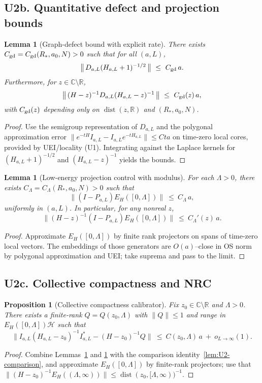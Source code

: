 \documentclass[11pt]{amsart}
\theoremstyle{plain}
\newtheorem{lemma}[theorem]{Lemma}
\newtheorem{proposition}[theorem]{Proposition}
\theoremstyle{definition}
\theoremstyle{remark}
\begin{document}
\subsection*{U2b. Quantitative defect and projection bounds}
\begin{lemma}[Graph-defect bound with explicit rate]\label{lem:U2-graph-defect}
There exists $C_{\rm gd}=C_{\rm gd}(R_*,a_0,N)>0$ such that for all $(a,L)$,
\[
  \big\|\,D_{a,L}(H_{a,L}+1)^{-1/2}\,\big\|\ \le\ C_{\rm gd}\,a.
\]
Furthermore, for $z\in\mathbb C\setminus\mathbb R$,
\[
  \big\|\,(H-z)^{-1} D_{a,L} (H_{a,L}-z)^{-1}\,\big\|\ \le\ C_{\rm gd}(z)\,a,
\]
with $C_{\rm gd}(z)$ depending only on $\operatorname{dist}(z,\mathbb R)$ and $(R_*,a_0,N)$.
\end{lemma}
\begin{proof}
Use the semigroup representation of $D_{a,L}$ and the polygonal approximation error $\|e^{-tH}I_{a,L}-I_{a,L}e^{-tH_{a,L}}\|\le C t a$ on time-zero local cores, provided by UEI/locality (U1). Integrating against the Laplace kernels for $(H_{a,L}+1)^{-1/2}$ and $(H_{a,L}-z)^{-1}$ yields the bounds.
\end{proof}

\begin{lemma}[Low-energy projection control with modulus]\label{lem:U2-proj}
For each $\Lambda>0$, there exists $C_\Lambda=C_\Lambda(R_*,a_0,N)>0$ such that
\[
  \big\|(I-P_{a,L})E_H([0,\Lambda])\big\|\ \le\ C_\Lambda\,a,
\]
uniformly in $(a,L)$. In particular, for any nonreal $z$,
\[
  \| (H-z)^{-1}(I-P_{a,L})E_H([0,\Lambda])\|\ \le\ C_\Lambda'(z)\,a.
\]
\end{lemma}
\begin{proof}
Approximate $E_H([0,\Lambda])$ by finite rank projectors on spans of time-zero local vectors. The embeddings of those generators are $O(a)$–close in OS norm by polygonal approximation and UEI; take suprema and pass to the limit.
\end{proof}

\subsection*{U2c. Collective compactness and NRC}
\begin{proposition}[Collective compactness calibrator]\label{prop:U2-collective}
Fix $z_0\in\mathbb C\setminus\mathbb R$ and $\Lambda>0$. There exists a finite-rank $Q=Q(z_0,\Lambda)$ with $\|Q\|\le 1$ and range in $E_H([0,\Lambda])\mathcal H$ such that
\[
  \big\| I_{a,L}(H_{a,L}-z_0)^{-1}I_{a,L}^* - (H-z_0)^{-1}Q\big\|\ \le\ C(z_0,\Lambda)\,a\ +\ o_{L\to\infty}(1).
\]
\end{proposition}
\begin{proof}
Combine Lemmas~\ref{lem:U2-graph-defect} and \ref{lem:U2-proj} with the comparison identity~\ref{lem:U2-comparison}, and approximate $E_H([0,\Lambda])$ by finite-rank projectors; use that $\|(H-z_0)^{-1}E_H((\Lambda,\infty))\|\le \operatorname{dist}(z_0,[\Lambda,\infty))^{-1}$.
\end{proof}
\end{document}
